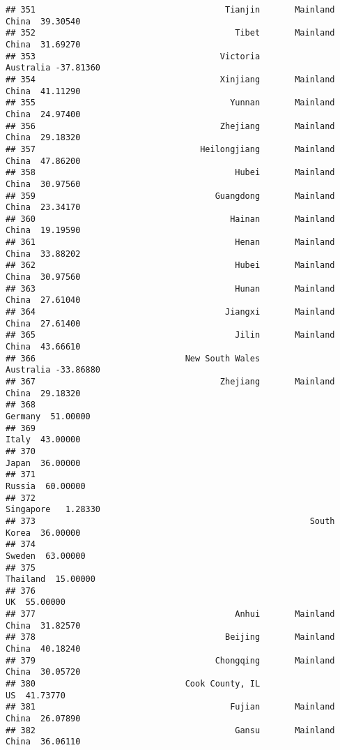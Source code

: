 \documentclass[
]{article}
\begin{document}
\begin{verbatim}
## 351                                      Tianjin       Mainland China  39.30540
## 352                                        Tibet       Mainland China  31.69270
## 353                                     Victoria            Australia -37.81360
## 354                                     Xinjiang       Mainland China  41.11290
## 355                                       Yunnan       Mainland China  24.97400
## 356                                     Zhejiang       Mainland China  29.18320
## 357                                 Heilongjiang       Mainland China  47.86200
## 358                                        Hubei       Mainland China  30.97560
## 359                                    Guangdong       Mainland China  23.34170
## 360                                       Hainan       Mainland China  19.19590
## 361                                        Henan       Mainland China  33.88202
## 362                                        Hubei       Mainland China  30.97560
## 363                                        Hunan       Mainland China  27.61040
## 364                                      Jiangxi       Mainland China  27.61400
## 365                                        Jilin       Mainland China  43.66610
## 366                              New South Wales            Australia -33.86880
## 367                                     Zhejiang       Mainland China  29.18320
## 368                                                           Germany  51.00000
## 369                                                             Italy  43.00000
## 370                                                             Japan  36.00000
## 371                                                            Russia  60.00000
## 372                                                         Singapore   1.28330
## 373                                                       South Korea  36.00000
## 374                                                            Sweden  63.00000
## 375                                                          Thailand  15.00000
## 376                                                                UK  55.00000
## 377                                        Anhui       Mainland China  31.82570
## 378                                      Beijing       Mainland China  40.18240
## 379                                    Chongqing       Mainland China  30.05720
## 380                              Cook County, IL                   US  41.73770
## 381                                       Fujian       Mainland China  26.07890
## 382                                        Gansu       Mainland China  36.06110

\end{verbatim}
\end{document}
